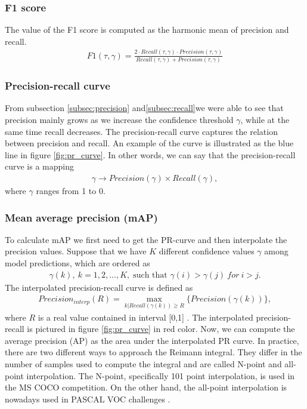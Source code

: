 \subsubsection{F1 score}
The value of the F1 score is computed as the harmonic mean of precision and recall.
\begin{align}
    F1(\tau, \gamma) = \frac{2 \cdot Recall(\tau,\gamma) \cdot Precision(\tau, \gamma)}{Recall(\tau,\gamma) + Precision(\tau, \gamma)}
\end{align}

\subsubsection{Precision-recall curve}
From subsection \ref{subsec:precision} and\ref{subsec:recall}we were able to see that precision mainly grows as we increase the confidence threshold $\gamma$, while at the same time recall decreases. The precision-recall curve captures the relation between precision and recall. An example of the curve is illustrated as the blue line in figure \ref{fig:pr_curve}. In other words, we can say that the precision-recall curve is a mapping
\begin{align}
    \gamma \rightarrow Precision(\gamma) \times  Recall(\gamma),
    \label{eq:pr_curve}
\end{align}
where $\gamma$ ranges from 1 to 0.

\subsubsection{Mean average precision (mAP)}
To calculate mAP we first need to get the PR-curve and then interpolate the precision values. Suppose that we have $K$ different confidence values $\gamma$ among model predictions, which are ordered as
\begin{align}
    \gamma(k),\: k = 1,2,...,K,  \; \text{such that } \gamma(i) > \gamma(j) \: for \: i > j.
\end{align}
The interpolated precision-recall curve is defined as
\begin{align}
    Precision_{interp}(R) = \max_{k|Recall(\gamma(k)) \geq R} \{  Precision(\gamma(k)) \},
\end{align}
where $R$ is a real value contained in interval [0,1] \cite{Padilla2021}.
The interpolated precision-recall is pictured in figure \ref{fig:pr_curve} in red color. Now, we can compute the average precision (AP) as the area under the interpolated PR curve.
In practice, there are two different ways to approach the Reimann integral. They differ in the number of samples used to compute the integral and are called N-point and all-point interpolation. The N-point, specifically 101 point interpolation, is used in the MS COCO competition. On the other hand, the all-point interpolation is nowadays used in PASCAL VOC challenges \cite{Padilla2020, Padilla2020}.

